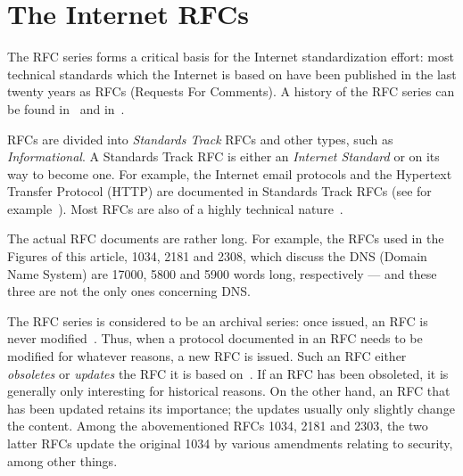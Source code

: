 \section{The Internet RFCs}

The RFC series forms a critical basis for the Internet standardization
effort: most technical standards which the Internet is based on have
been published in the last twenty years as RFCs (Requests For
Comments).  A history of the RFC series can be found
in~\cite{rfc-refguide} and in~\cite{thirty-years-of-rfc}.


RFCs are divided into \emph{Standards Track}\/ RFCs and other
types, such as \emph{Informational}\cite{rfc-authoring,not-all-rfcs-are-standards}.  
A Standards Track
RFC is either an \emph{Internet Standard} or on its way to become
one\cite{ietf-standardization}.  
For example, the Internet email protocols and the Hypertext Transfer Protocol
(HTTP) are 
documented in Standards Track RFCs (see for example~\cite{rfc822}).
Most RFCs are also of a highly technical 
nature~\cite{rfc-intro}.  


The actual RFC documents are rather long.  
For example, the RFCs used in the Figures of this article, 
1034, 2181 and 2308, which discuss the DNS (Domain Name System) 
are
17000, 5800 and 5900 words long, respectively --- and these three
are not the only ones concerning DNS.

The RFC series is considered to be an archival series:
once issued, an RFC is never modified~\cite{rfc-intro}.  Thus, when a
protocol documented in an RFC needs to be modified for whatever
reasons, a new RFC is issued.  Such an RFC either \emph{obsoletes} or 
\emph{updates} the RFC it is based on~\cite{rfc-authoring}.
If an RFC has been obsoleted, it is generally only interesting for
historical reasons. 
On the other hand, an RFC that has been updated retains its importance;
the updates usually only slightly change the content.
Among the abovementioned RFCs 1034, 2181 and 2303, the two latter
RFCs update the original 1034 by various amendments relating
to security, among other things.

